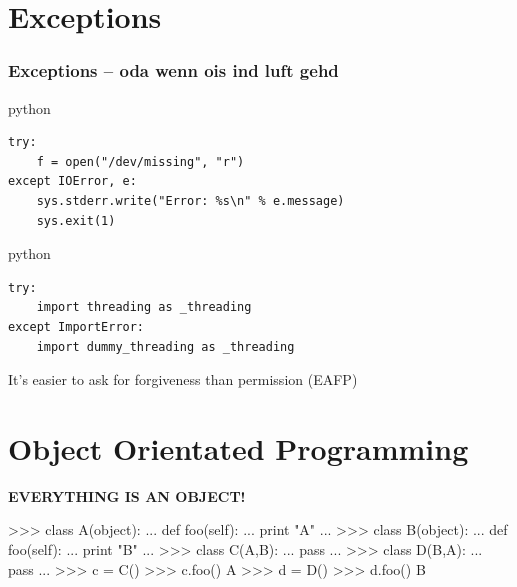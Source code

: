 \documentclass{beamer}
\begin{document}
\section{Exceptions}	%

\begin{frame}[fragile]
	\frametitle{Exceptions -- oda wenn ois ind luft gehd}
	\begin{exampleblock}{python}
	\begin{lstlisting}
try:
    f = open("/dev/missing", "r")
except IOError, e:
    sys.stderr.write("Error: %s\n" % e.message)
    sys.exit(1)
	\end{lstlisting}
	\end{exampleblock}

\pause

	\begin{exampleblock}{python}
	\begin{lstlisting}
try:
    import threading as _threading
except ImportError:
    import dummy_threading as _threading
	\end{lstlisting}
	\end{exampleblock}
	
	It's easier to ask for forgiveness than permission (EAFP)
\end{frame}

\section{Object Orientated Programming}

\begin{frame}[plain]
	\begin{center}
	\huge{\textbf{EVERYTHING IS AN OBJECT!}}
	\end{center}
\end{frame}


>>> class A(object):
...     def foo(self):
...             print "A"
...
>>> class B(object):
...     def foo(self):
...             print "B"
...
>>> class C(A,B):
...     pass
...
>>> class D(B,A):
...     pass
...
>>> c = C()
>>> c.foo()
A
>>> d = D()
>>> d.foo()
B
\end{document}
